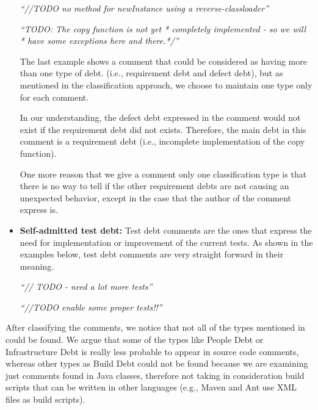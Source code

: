 \begin{itemize}
\begin{displayquote}
  	\vspace{1mm}
  	
  	\textit{``//TODO no method for newInstance using a reverse-classloader''}

  	\vspace{1mm}
  	
  	\textit{``TODO: The copy function is not yet * completely implemented - so we will  * have some exceptions here and there.*/''}  
  	
  \end{displayquote}
  \vspace{1mm}  
  
  	The last example shows a comment that could be considered as having more than one type of debt. (i.e., requirement debt and defect debt), but as mentioned in the classification approach, we choose to maintain one type only for each comment. 
  	
  	In our understanding, the defect debt expressed in the comment would not exist if the requirement debt did not exists. Therefore, the main debt in this comment is a requirement debt (i.e., incomplete implementation of the copy function). 
  	
  	One more reason that we give a comment only one classification type is that there is no way to tell if the other requirement debts are not causing an unexpected behavior, except in the case that the author of the comment express is. 
  
  \vspace{1mm}
  \item \textbf{Self-admitted test debt:} Test debt comments are the ones that express the need for implementation or improvement of the current tests. As shown in the examples below, test debt comments are very straight forward in their meaning. 
  
  \begin{displayquote}
  	\textit{``// TODO - need a lot more tests''}
  	
  	\vspace{1mm}
  	
  	\textit{``//TODO enable some proper tests!!''}
  \end{displayquote}
  \vspace{1mm}  
    
\end{itemize}

After classifying the comments, we notice that not all of the types mentioned in \cite{Alves2014MTD} could be found. We argue that some of the types like People Debt or Infrastructure Debt is really less probable to appear in source code comments, whereas other types as Build Debt could not be found because we are examining just comments found in Java classes, therefore not taking in consideration build scripts that can be written in other languages (e.g., Maven and Ant use XML files as build scripts). 

